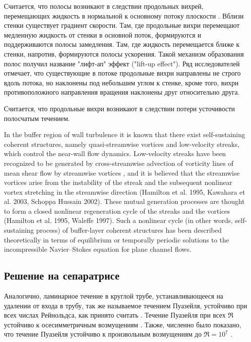 Считается, что полосы возникают в следствии продольных вихрей, перемещающих жидкость в нормальной к основному потоку плоскости \cite{Kline1967, Blackwelder1979}. Вблизи стенки существует градиент скорости. Там, где продольные вихри перемещают медленную жидкость от стенки в основной поток, формируются и поддерживаются полосы замедления. Там, где жидкость перемещается ближе к стенки, напротив, формируются полосы ускорения. Такой механизм образования полос получил название "лифт-ап" эффект ("lift-up effect"). Ряд исследователей \cite{Jeong1997, Schoppa2002} отмечает, что существующие в потоке продольные вихри направлены не строго вдоль потока, но наклонены под небольшим углом к стенке, кроме того, вихри противоположного направления вращения наклонены друг относительно друга. 

Считается, что продольные вихри возникают в следствии потери усточивости полосчатым течением. 

In the buffer region of wall turbulence it is known that there exist self-sustaining coherent structures, namely quasi-streamwise vortices and low-velocity streaks, which control the near-wall flow dynamics. Low-velocity streaks have been recognized to be generated by cross-streamwise advection of vorticity lines of mean shear flow by streamwise vortices , and it is believed that the streamwise vortices arise from the instability of the streak and the subsequent nonlinear vortex stretching in the streamwise direction (Hamilton et al. 1995, Kawahara et al. 2003, Schoppa  Hussain 2002). These mutual generation processes are thought to form a closed nonlinear regeneration cycle of the streaks and the vortices (Hamilton et al. 1995, Waleffe 1997). Such a nonlinear cycle (in other words, self-sustaining process) of buffer-layer coherent structures has been described theoretically in terms of equilibrium or temporally periodic solutions to the incompressible Navier–Stokes equation for plane channel flows. 



	\subsection{Решение на сепаратрисе}

Аналогично, ламинарное течение в круглой трубе, устанавливающееся на удалении от входа в трубу, так же называемое течением Пуазейля, устойчиво при всех числах Рейнольдса, как принято считать \cite{Kerswell2005}. Течение Пуазейля при всех $\Re$ устойчиво к осесимметричным возмущениям \cite{Salwen1980}. Также, численно было показано, что течение Пуазейля устойчиво к произвольным возмущениям до $\Re = 10^7$ \cite{Meseguer2003}. 

